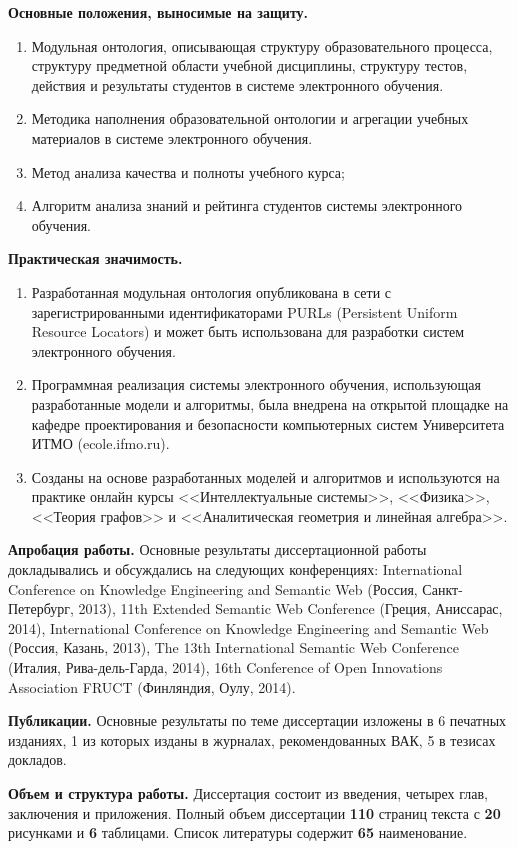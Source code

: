 \textbf{Основные положения, выносимые на защиту.}
\begin{enumerate}
 \item Модульная онтология, описывающая структуру образовательного процесса, структуру предметной области учебной дисциплины, структуру тестов, действия и результаты студентов в системе электронного обучения.
 \item Методика наполнения образовательной онтологии и агрегации учебных материалов в системе электронного обучения.
 \item Метод анализа качества и полноты учебного курса;
 \item Алгоритм анализа знаний и рейтинга студентов системы электронного обучения.
 \end{enumerate}


\textbf{Практическая значимость.}
\begin{enumerate}
 \item Разработанная модульная онтология опубликована в сети с зарегистрированными идентификаторами PURLs (Persistent Uniform Resource Locators) и может быть использована для разработки систем электронного обучения.
 \item Программная реализация системы электронного обучения, использующая разработанные модели и алгоритмы, была внедрена на открытой площадке на кафедре проектирования и безопасности компьютерных систем Университета ИТМО (ecole.ifmo.ru). 
 \item Созданы на основе разработанных моделей и алгоритмов и используются на практике онлайн курсы 
<<Интеллектуальные системы>>, <<Физика>>, <<Теория графов>> и <<Аналитическая геометрия и линейная алгебра>>.
 \end{enumerate}
 
 


\textbf{Апробация работы.}
Основные результаты диссертационной работы докладывались и обсуждались на следующих конференциях:
International Conference on Knowledge Engineering and Semantic Web (Россия, Санкт-Петербург, 2013),
11th Extended Semantic Web Conference (Греция, Аниссарас, 2014), International Conference on Knowledge Engineering and Semantic Web (Россия, Казань, 2013), The 13th International Semantic Web Conference (Италия, Рива-дель-Гарда, 2014), 16th Conference of Open
Innovations Association FRUCT (Финляндия, Оулу, 2014).

\textbf{Публикации.} Основные результаты по теме диссертации изложены в 6 печатных изданиях, 1 из которых изданы в журналах, рекомендованных ВАК, 5 в тезисах докладов.

\textbf{Объем и структура работы.} Диссертация состоит из введения, четырех глав, заключения и приложения. Полный объем диссертации \textbf{110} страниц текста с \textbf{20} рисунками и \textbf{6} таблицами. Список литературы содержит \textbf{65} наименование.

\clearpage